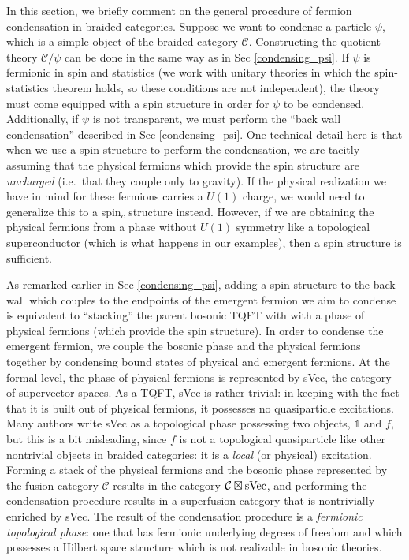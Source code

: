 \documentclass[12pt,a4paper]{article}
\newcommand{\unit}{\mathds{1}}
\newcommand{\mcc}{\mathcal{C}}
\begin{document}
In this section, we briefly comment on the general procedure of fermion condensation in braided categories. 
Suppose we want to condense a particle $\psi$, which is a simple object of the braided category $\mcc$. 
Constructing the quotient theory $\mcc /\psi$ can be done in the same way as in Sec \ref{condensing_psi}. 
If $\psi$ is fermionic in spin and statistics (we work with unitary theories in which the spin-statistics theorem holds, so these conditions are not independent), the theory must come equipped with a spin structure in order for $\psi$ to be condensed. 
Additionally, if $\psi$ is not transparent, we must perform the ``back wall condensation'' described in Sec \ref{condensing_psi}. 
One technical detail here is that when we use a spin structure %
to perform the condensation, we are tacitly assuming that the physical fermions which provide the spin structure are {\it uncharged} (i.e.\ that they couple only to gravity). 
If the physical realization we have in mind for these fermions carries a $U(1)$ charge, we would need to generalize this to a spin$_c$ structure instead. 
However, if we are obtaining the physical fermions from a phase without $U(1)$ symmetry like a topological superconductor (which is what happens in our examples), then a spin structure is sufficient. 

As remarked earlier in Sec \ref{condensing_psi}, adding a spin structure to the back wall which couples to the endpoints of the emergent fermion we aim to condense is equivalent to ``stacking'' the parent bosonic TQFT with with a phase of physical fermions (which provide the spin structure). 
In order to condense the emergent fermion, we couple the bosonic phase and the physical fermions together by condensing bound states of physical and emergent fermions. 
At the formal level, the phase of physical fermions is represented by sVec, the category of supervector spaces.
As a TQFT, sVec is rather trivial: in keeping with the fact that it is built out of physical fermions, it possesses no quasiparticle excitations. 
Many authors write sVec as a topological phase possessing two objects, $\unit$ and $f$, but this is a bit misleading, since $f$ is not a topological quasiparticle like other nontrivial objects in braided categories: it is a {\it local} (or physical) excitation. 
Forming a stack of the physical fermions and the bosonic phase represented by the fusion category $\mcc$ results in the category $\mcc \boxtimes {\rm sVec}$, and performing the condensation procedure results in a superfusion category that is nontrivially enriched by sVec. 
The result of the condensation procedure is a {\it fermionic topological phase}: one that has fermionic underlying degrees of freedom and which possesses a Hilbert space structure which is not realizable in bosonic theories. 
\end{document}
